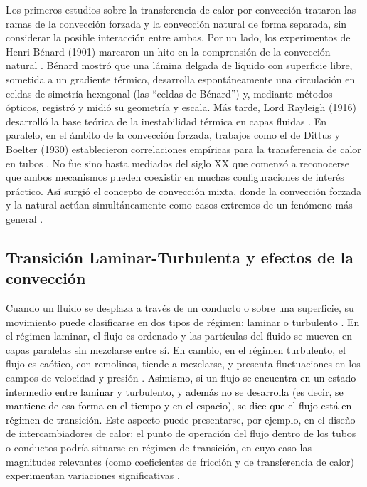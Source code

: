 Los primeros estudios sobre la transferencia de calor por convección trataron las ramas de la convección forzada y la convección natural de forma separada, sin considerar \linebreak la posible interacción entre ambas. Por un lado, los experimentos de Henri Bénard (1901) marcaron un hito en la comprensión de la convección natural \cite{benard1901}. Bénard mostró que una lámina delgada de líquido con superficie libre, sometida a un gradiente térmico, desarrolla espontáneamente una circulación en celdas de simetría hexagonal (las ``celdas de Bénard'') y, mediante métodos ópticos, registró y midió su geometría y escala. Más tarde, Lord Rayleigh (1916) desarrolló la base teórica de la inestabilidad térmica en capas fluidas \cite{rayleigh1916}. En paralelo, en el ámbito de la convección forzada, trabajos como el de Dittus y Boelter (1930) establecieron correlaciones empíricas para la transferencia de calor en tubos \cite{dittus1930}. No fue sino hasta mediados del siglo XX que comenzó a reconocerse que ambos mecanismos pueden coexistir en muchas configuraciones de interés práctico. Así surgió el concepto de convección mixta, donde la convección forzada y la natural actúan simultáneamente como casos extremos de un fenómeno más general \cite{metais1964}. 

\subsection*{Transición Laminar-Turbulenta y efectos de la convección}

Cuando un fluido se desplaza a través de un conducto o sobre una superficie, su movimiento puede clasificarse en dos tipos de régimen: laminar o turbulento \cite{white}. En el régimen laminar, el flujo es ordenado y las partículas del fluido se mueven en capas paralelas sin mezclarse entre sí. En cambio, en el régimen turbulento, el flujo es caótico, con remolinos, tiende a mezclarse, y presenta fluctuaciones en los campos de velocidad y presión \cite{kundu}. \textcolor{black}{Asimismo, si un flujo se encuentra en un estado intermedio entre laminar y turbulento, y además no se desarrolla (es \linebreak decir, se mantiene de esa forma en el tiempo y en el espacio), se dice que el flujo está en régimen de transición.} Este aspecto puede presentarse, por ejemplo, en el diseño de \linebreak intercambiadores de calor: el punto de operación del flujo dentro de los tubos o conductos podría situarse en régimen de transición, en cuyo caso las magnitudes relevantes (como coeficientes de fricción y de transferencia de calor) experimentan variaciones significativas \cite{ghajar2019heat}. 


